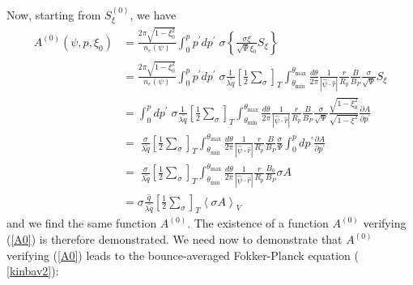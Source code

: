 Now, starting from $S_{\xi}^{\left( 0\right) }$, we have
\begin{align}
A^{\left( 0\right) }\left( \psi,p,\xi_{0}\right) & =\frac{2\pi\sqrt
{1-\xi_{0}^{2}}}{n_{e}\left( \psi\right) }\int_{0}^{p}p^{\prime}dp^{\prime
}\;\sigma\left\{ \frac{\sigma\xi}{\sqrt{\Psi}\xi_{0}}S_{\xi}\right\}
\nonumber \\
& =\frac{2\pi\sqrt{1-\xi_{0}^{2}}}{n_{e}\left( \psi\right) }
\int_{0}^{p}p^{\prime}dp^{\prime}\;\sigma\frac{1}{\lambda\widetilde{q}}
\left[ \frac{1}{2}\sum_{\sigma}\right]
_{T}\int_{\theta_{\min}}^{\theta_{\max}}\frac{d\theta}{2\pi}\frac{1}{\left|
\widehat{\psi}\cdot\widehat{r}\right| }\frac{r}{R_{p}}\frac{B}{B_{P}}\frac{
\sigma}{\sqrt{\Psi}}S_{\xi}  \nonumber \\
& =\int_{0}^{p}dp^{\prime}\;\sigma\frac{1}{\lambda\widetilde{q}}\left[ \frac{
1}{2}\sum_{\sigma}\right] _{T}\int_{\theta_{\min}}^{\theta_{\max}}\frac{
d\theta}{2\pi}\frac{1}{\left| \widehat{\psi}\cdot\widehat{r}\right| }\frac{r%
}{R_{p}}\frac{B}{B_{P}}\frac{\sigma}{\sqrt{\Psi}}\frac{\sqrt{1-\xi _{0}^{2}}%
}{\sqrt{1-\xi^{2}}}\frac{\partial A}{\partial p^{\prime}}  \nonumber \\
& =\;\frac{\sigma}{\lambda\widetilde{q}}\left[ \frac{1}{2}\sum_{\sigma
}\right] _{T}\int_{\theta_{\min}}^{\theta_{\max}}\frac{d\theta}{2\pi}\frac
{1}{\left| \widehat{\psi}\cdot\widehat{r}\right| }\frac{r}{R_{p}}\frac
{B}{B_{P}}\frac{\sigma}{\Psi}\int_{0}^{p}dp^{\prime}\frac{\partial A}{
\partial p^{\prime}}  \nonumber \\
& =\;\frac{\sigma}{\lambda\widetilde{q}}\left[ \frac{1}{2}\sum_{\sigma
}\right] _{T}\int_{\theta_{\min}}^{\theta_{\max}}\frac{d\theta}{2\pi}\frac
{1}{\left| \widehat{\psi}\cdot\widehat{r}\right| }\frac{r}{R_{p}}\frac
{B_{0}}{B_{P}}\sigma A  \nonumber \\
& =\sigma\frac{\widehat{q}}{\lambda\widetilde{q}}\left[ \frac{1}{2}
\sum_{\sigma}\right] _{T}\left\langle \sigma A\right\rangle _{V}
\end{align}
and we find the same function $A^{\left( 0\right) }$. The existence of a
function $A^{\left( 0\right) }$ verifying (\ref{A0}) is therefore
demonstrated. We need now to demonstrate that $A^{\left( 0\right) }$
verifying (\ref{A0}) leads to the bounce-averaged Fokker-Planck equation (%
\ref{kinbav2}):
